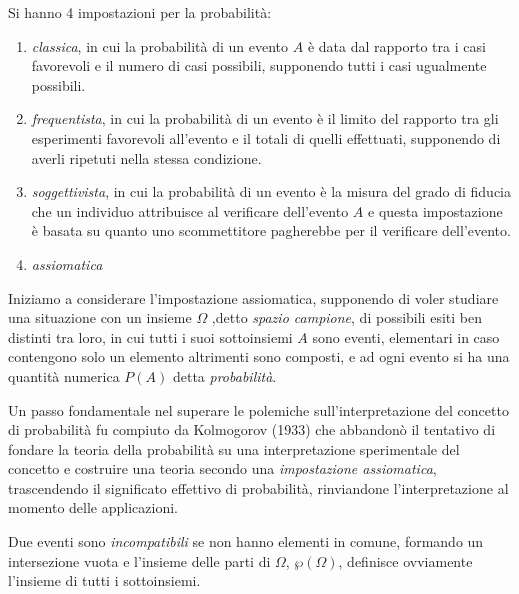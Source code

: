 \documentclass[a4paper,12pt, oneside]{book}
\begin{document}
Si hanno 4 impostazioni per la probabilità:
\begin{enumerate}
    \item \emph{classica}, in cui la probabilità di un evento $A$ è data dal rapporto tra i casi favorevoli e il
          numero di casi possibili, supponendo tutti i casi ugualmente possibili.
    \item \emph{frequentista}, in cui la probabilità di un evento è il limito del rapporto tra gli esperimenti
          favorevoli all'evento e il totali di quelli effettuati, supponendo di averli ripetuti nella stessa
          condizione.
    \item \emph{soggettivista}, in cui la probabilità di un evento è la misura del grado di fiducia che un individuo
          attribuisce al verificare dell'evento $A$ e questa impostazione è basata su quanto uno scommettitore
          pagherebbe per il verificare dell'evento.
    \item \emph{assiomatica}
\end{enumerate}
Iniziamo a considerare l'impostazione assiomatica, supponendo di voler studiare una situazione con un insieme $\Omega$
,detto \emph{spazio campione}, di possibili esiti ben distinti tra loro, in cui tutti i suoi sottoinsiemi $A$
sono eventi, elementari in caso contengono solo un elemento altrimenti sono composti,
e ad ogni evento si ha una quantità numerica $P(A)$ detta \emph{probabilità}.

Un passo fondamentale nel superare le polemiche sull'interpretazione del concetto di probabilità
fu compiuto da Kolmogorov (1933) che abbandonò il tentativo di fondare la teoria della probabilità su una 
interpretazione sperimentale del concetto e costruire una teoria secondo una \emph{impostazione assiomatica},
trascendendo il significato effettivo di probabilità, rinviandone l'interpretazione al momento delle applicazioni.

Due eventi sono \emph{incompatibili} se non hanno elementi in comune, formando un intersezione vuota
e l'insieme delle parti di $\Omega$, $\wp(\Omega)$, definisce ovviamente l'insieme di tutti i sottoinsiemi.
\end{document}

